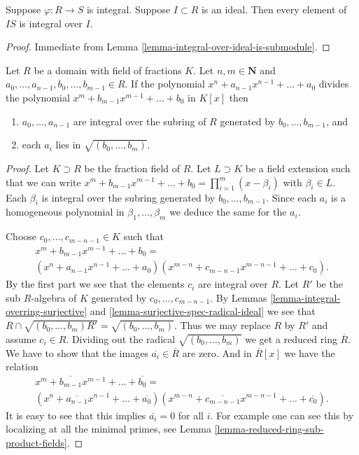 \begin{lemma}
\label{lemma-integral-integral-over-ideal}
Suppose $\varphi : R \to S$ is integral.
Suppose $I \subset R$ is an ideal.
Then every element of $IS$ is integral over $I$.
\end{lemma}

\begin{proof}
Immediate from Lemma \ref{lemma-integral-over-ideal-is-submodule}.
\end{proof}

\begin{lemma}
\label{lemma-polynomials-divide}
Let $R$ be a domain with field of fractions $K$.
Let $n, m \in \mathbf{N}$ and
$a_0, \ldots, a_{n-1}, b_0, \ldots, b_{m-1} \in R$.
If the polynomial $x^n + a_{n-1}x^{n-1} + \ldots + a_0$
divides the polynomial $x^m + b_{m-1} x^{m-1} + \ldots + b_0$
in $K[x]$ then
\begin{enumerate}
\item $a_0, \ldots, a_{n-1}$ are integral over the subring
of $R$ generated by $b_0, \ldots, b_{m-1}$, and
\item each $a_i$ lies in $\sqrt{(b_0, \ldots, b_m)}$.
\end{enumerate}
\end{lemma}

\begin{proof}
Let $K \supset R$ be the fraction field of $R$.
Let $L \supset K$ be a field extension such that
we can write $x^m + b_{m-1} x^{m-1} + \ldots + b_0 =
\prod_{i = 1}^m (x-\beta_i)$ with $\beta_i \in L$.
Each $\beta_i$ is integral over the subring generated
by $b_0, \ldots, b_{m-1}$. Since each $a_i$ is a
homogeneous polynomial in $\beta_1, \ldots, \beta_m$
we deduce the same for the $a_i$.

\medskip\noindent
Choose $c_0, \ldots, c_{m-n-1} \in K$ such that
$$
\begin{matrix}
x^m + b_{m-1} x^{m-1} + \ldots + b_0 =  \\
(x^n + a_{n-1}x^{n-1} + \ldots + a_0)
(x^{m-n} + c_{m-n-1}x^{m-n-1}+ \ldots + c_0).
\end{matrix}
$$
By the first part we see that the elements $c_i$
are integral over $R$. Let $R'$ be the sub $R$-algebra
of $K$ generated by $c_0, \ldots, c_{m-n-1}$.
By Lemmas \ref{lemma-integral-overring-surjective}
and \ref{lemma-surjective-spec-radical-ideal}
we see that $R \cap \sqrt{(b_0, \ldots, b_m)R'}
= \sqrt{(b_0, \ldots, b_m)}$. Thus we may replace
$R$ by $R'$ and assume $c_i \in R$.
Dividing out the radical $\sqrt{(b_0, \ldots, b_m)}$
we get a reduced ring $\overline{R}$.
We have to show that the images $\overline{a_i} \in \overline{R}$
are zero. And in
$\overline{R}[x]$ we have the relation
$$
\begin{matrix}
x^m + \overline{b_{m-1}} x^{m-1} + \ldots + \overline{b_0} = \\
(x^n + \overline{a_{n-1}}x^{n-1} + \ldots + \overline{a_0})
(x^{m-n} + \overline{c_{m-n-1}}x^{m-n-1}+ \ldots + \overline{c_0}).
\end{matrix}
$$
It is easy to see that this implies $\overline{a_i} = 0$ for all $i$.
For example one can see this by localizing at all the minimal
primes, see Lemma \ref{lemma-reduced-ring-sub-product-fields}.
\end{proof}

